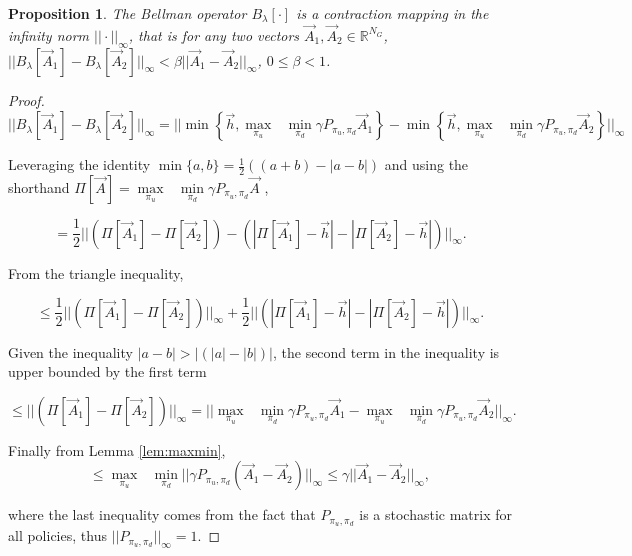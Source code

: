 \documentclass{journal}
\newcommand{\RR}{\mathbb{R}}
\newtheorem{proposition}{Proposition}
\begin{document}
\begin{proposition} 
The Bellman operator $B_{\lambda}[\cdot]$ is a contraction mapping in the infinity norm $|| \cdot ||_{\infty}$, that is for any two vectors $\vec{A}_1, \vec{A}_2 \in \RR^{N_G}$,  $||B_{\lambda}[\vec{A}_1] - B_{\lambda}[\vec{A}_2]||_{\infty} < \beta||\vec{A}_1 - \vec{A}_2||_{\infty}$, $0\leq \beta <1$.
\end{proposition}
\begin{proof}
\begin{equation*}
||B_{\lambda}[\vec{A}_1] - B_{\lambda}[\vec{A}_2]||_{\infty} = ||\min\left\{ \vec{h}, \underset{\pi_u}{\max}\text{ }\underset{ \pi_d}{\min} \gamma P_{\pi_u, \pi_d} \vec{A}_1 \right \}  - \min\left\{ \vec{h}, \underset{\pi_u}{\max}\text{ }\underset{ \pi_d}{\min} \gamma P_{\pi_u, \pi_d} \vec{A}_2 \right \}||_{\infty}
\end{equation*}

\noindent Leveraging the identity $\min\{a,b\} = \frac{1}{2}((a+b)- |a-b|)$ and using the shorthand $\Pi[\vec{A}]=\underset{\pi_u}{\max}\text{ }\underset{ \pi_d}{\min} \gamma P_{\pi_u, \pi_d} \vec{A}$ ,

\begin{equation*}
= \frac{1}{2} ||(\Pi[\vec{A}_1]  - \Pi[\vec{A}_2] ) -  (|\Pi[\vec{A}_1]-\vec{h}|  - |\Pi[\vec{A}_2]-\vec{h}|)||_{\infty}.
\end{equation*}

\noindent From the triangle inequality,

\begin{equation*}
\leq \frac{1}{2} ||(\Pi[\vec{A}_1]  - \Pi[\vec{A}_2] )||_{\infty} + \frac{1}{2}  ||(|\Pi[\vec{A}_1]-\vec{h}|  - |\Pi[\vec{A}_2]-\vec{h}|)||_{\infty}.
\end{equation*}

\noindent Given the inequality $|a-b| > |(|a|-|b|)|$, the second term in the inequality is upper bounded by the first term

\begin{equation*}
\leq ||(\Pi[\vec{A}_1]  - \Pi[\vec{A}_2] )||_{\infty}= ||\underset{\pi_u}{\max}\text{ }\underset{ \pi_d}{\min} \gamma P_{\pi_u, \pi_d}\vec{A}_1 - \underset{\pi_u}{\max}\text{ }\underset{ \pi_d}{\min} \gamma P_{\pi_u, \pi_d} \vec{A}_2||_{\infty}.
\end{equation*}

\noindent Finally from Lemma \ref{lem:maxmin},
\begin{equation*}
\leq \underset{\pi_u}{\max}\text{ }\underset{ \pi_d}{\min} ||\gamma P_{\pi_u, \pi_d} (\vec{A}_1 - \vec{A}_2)||_{\infty} \leq \gamma||\vec{A}_1 - \vec{A}_2||_{\infty},
\end{equation*}

\noindent where the last inequality comes from the fact that $P_{\pi_u, \pi_d}$ is a stochastic matrix for all policies, thus $||P_{\pi_u, \pi_d}||_{\infty} = 1$.
\end{proof}
\end{document}
